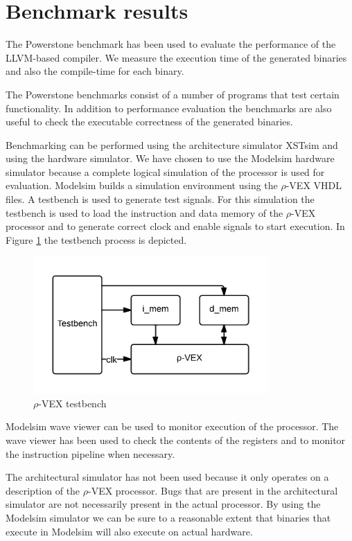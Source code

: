 
\section{Benchmark results}
The Powerstone benchmark \cite{Jeff-Scott:1998fj} has been used to evaluate the performance of the LLVM-based compiler. We measure the execution time of the generated binaries and also the compile-time for each binary. 

The Powerstone benchmarks consist of a number of programs that test certain functionality. In addition to performance evaluation the benchmarks are also useful to check the executable correctness of the generated binaries. 

Benchmarking can be performed using the architecture simulator XSTsim and using the hardware simulator. We have chosen to use the Modelsim hardware simulator because a complete logical simulation of the processor is used for evaluation. Modelsim builds a simulation environment using the $\rho$-VEX VHDL files. A testbench is used to generate test signals. For this simulation the testbench is used to load the instruction and data memory of the $\rho$-VEX processor and to generate correct clock and enable signals to start execution. In Figure \ref{fig:rvex_tb} the testbench process is depicted.

\begin{figure}[ht]
\centering
\includegraphics[width=0.8\textwidth]{5_results/img/testbench.png}
\caption{$\rho$-VEX testbench}
\label{fig:rvex_tb}
\end{figure}

Modelsim wave viewer can be used to monitor execution of the processor. The wave viewer has been used to check the contents of the registers and to monitor the instruction pipeline when necessary.

The architectural simulator has not been used because it only operates on a description of the $\rho$-VEX processor. Bugs that are present in the architectural simulator are not necessarily present in the actual processor. By using the Modelsim simulator we can be sure to a reasonable extent that binaries that execute in Modelsim will also execute on actual hardware. 

